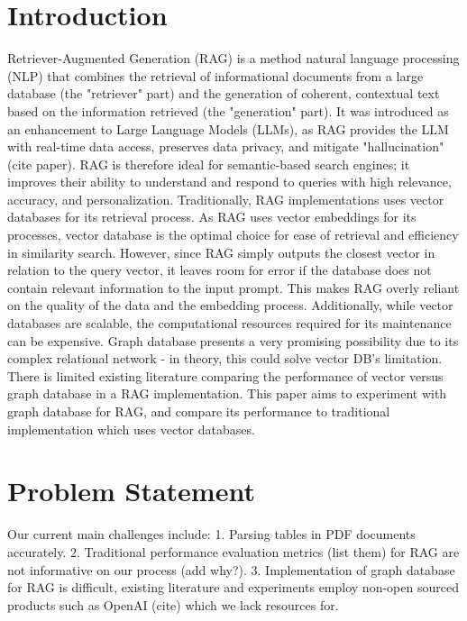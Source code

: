 \documentclass{scrartcl}
\begin{document}
\section{Introduction}
Retriever-Augmented Generation (RAG) is a method natural language processing (NLP) that combines the retrieval of informational documents from a large database (the "retriever" part) and the generation of coherent, contextual text based on the information retrieved (the "generation" part). 
It was introduced as an enhancement to Large Language Models (LLMs), as RAG provides the LLM with real-time data access, preserves data privacy, and mitigate "hallucination" (cite paper). RAG is therefore ideal for semantic-based search engines; it improves their ability to understand and respond to queries with high relevance, accuracy, and personalization. 
Traditionally, RAG implementations uses vector databases for its retrieval process. As RAG uses vector embeddings for its processes, vector database is the optimal choice for ease of retrieval and efficiency in similarity search. 
However, since RAG simply outputs the closest vector in relation to the query vector, it leaves room for error if the database does not contain relevant information to the input prompt. This makes RAG overly reliant on the quality of the data and the embedding process. Additionally, while vector databases are scalable, the computational resources required for its maintenance can be expensive. 
Graph database presents a very promising possibility due to its complex relational network - in theory, this could solve vector DB's limitation. 
There is limited existing literature comparing the performance of vector versus graph database in a RAG implementation. This paper aims to experiment with graph database for RAG, and compare its performance to traditional implementation which uses vector databases.

\section{Problem Statement}
Our current main challenges include:
1. Parsing tables in PDF documents accurately.
2. Traditional performance evaluation metrics (list them) for RAG are not informative on our process (add why?). 
3. Implementation of graph database for RAG is difficult, existing literature and experiments employ non-open sourced products such as OpenAI (cite) which we lack resources for.
\end{document}

